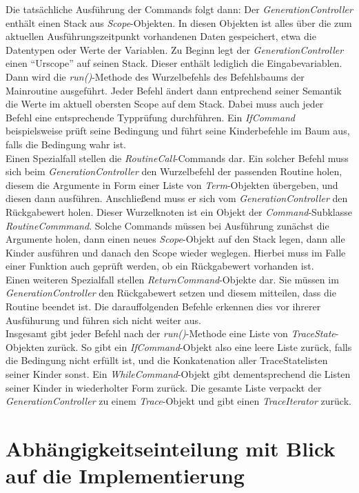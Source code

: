 \documentclass[parskip=full]{scrartcl}
\begin{document}
Die tatsächliche Ausführung der Commands folgt dann: Der \textit{GenerationController} enthält einen Stack aus \textit{Scope}-Objekten. In diesen Objekten ist alles über die zum aktuellen Ausführungszeitpunkt vorhandenen Daten gespeichert, etwa die Datentypen oder Werte der Variablen. Zu Beginn legt der \textit{GenerationController} einen \enquote{Urscope} auf seinen Stack. Dieser enthält lediglich die Eingabevariablen. Dann wird die \textit{run()}-Methode des Wurzelbefehls des Befehlsbaums der Mainroutine ausgeführt. Jeder Befehl ändert dann entprechend seiner Semantik die Werte im aktuell obersten Scope auf dem Stack. Dabei muss auch jeder Befehl eine entsprechende Typprüfung durchführen. Ein \textit{IfCommand} beispielsweise prüft seine Bedingung und führt seine Kinderbefehle im Baum aus, falls die Bedingung wahr ist. \\
Einen Spezialfall stellen die \textit{RoutineCall}-Commands dar. Ein solcher Befehl muss sich beim \textit{GenerationController} den Wurzelbefehl der passenden Routine holen, diesem die Argumente in Form einer Liste von \textit{Term}-Objekten übergeben, und diesen dann ausführen. Anschließend muss er sich vom \textit{GenerationController} den Rückgabewert holen. Dieser Wurzelknoten ist ein Objekt der \textit{Command}-Subklasse \textit{RoutineCommmand}. Solche Commands müssen bei Ausführung zunächst die Argumente holen, dann einen neues \textit{Scope}-Objekt auf den Stack legen, dann alle Kinder ausführen und danach den Scope wieder weglegen. Hierbei muss im Falle einer Funktion auch geprüft werden, ob ein Rückgabewert vorhanden ist.\\
Einen weiteren Spezialfall stellen \textit{ReturnCommand}-Objekte dar. Sie müssen im \textit{GenerationController} den Rückgabewert setzen und diesem mitteilen, dass die Routine beendet ist. Die darauffolgenden Befehle erkennen dies vor ihrerer Ausfühurung und führen sich nicht weiter aus. \\
Insgesamt gibt jeder Befehl nach der \textit{run()}-Methode eine Liste von  \textit{TraceState}-Objekten zurück. So gibt ein \textit{IfCommand}-Objekt also eine leere Liste zurück, falls die Bedingung nicht erfüllt ist, und die Konkatenation aller TraceStatelisten seiner Kinder sonst. Ein \textit{WhileCommand}-Objekt gibt dementsprechend die Listen seiner Kinder in wiederholter Form zurück. Die gesamte Liste verpackt der \textit{GenerationController} zu einem \textit{Trace}-Objekt und gibt einen \textit{TraceIterator} zurück.

\newpage
\section{Abhängigkeitseinteilung mit Blick auf die Implementierung}
\label{implementierung}
\end{document}
